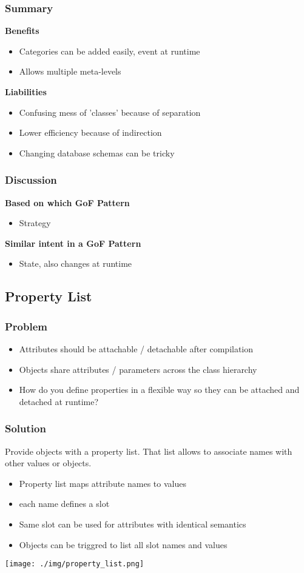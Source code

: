 \subsubsection{Summary}
\textbf{Benefits}
\begin{itemize}
    \item Categories can be added easily, event at runtime
    \item Allows multiple meta-levels
\end{itemize}
\textbf{Liabilities}
\begin{itemize}
    \item Confusing mess of 'classes' because of separation
    \item Lower efficiency because of indirection
    \item Changing database schemas can be tricky
\end{itemize}
\subsubsection{Discussion}
\textbf{Based on which GoF Pattern}
\begin{itemize}
    \item Strategy
\end{itemize}
\textbf{Similar intent in a GoF Pattern}
\begin{itemize}
    \item State, also changes at runtime
\end{itemize}

\subsection{Property List}
\subsubsection{Problem}
\begin{itemize}
    \item Attributes should be attachable / detachable after compilation
    \item Objects share attributes / parameters across the class hierarchy
    \item How do you define properties in a flexible way so they can be attached and detached at runtime?
\end{itemize}
\subsubsection{Solution}
Provide objects with a property list. That list allows to associate names with other values or objects.
\begin{itemize}
    \item Property list maps attribute names to values
    \item each name defines a slot
    \item Same slot can be used for attributes with identical semantics
    \item Objects can be triggred to list all slot names and values
\end{itemize}
\texttt{[image: ./img/property\_list.png]}
